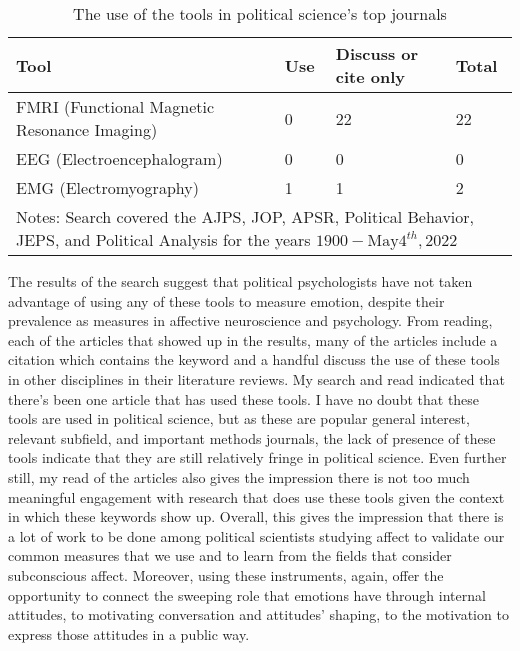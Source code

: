 \documentclass[12pt]{article}
\begin{document}
\begin{table}[h!]
    \centering
    \caption{The use of the tools in political science's top journals}
    \begin{tabular}{p{7cm}p{2cm}p{4cm}p{2cm}}
        \hline
        Tool & Use & Discuss or cite only & Total \\
        \hline
        FMRI (Functional Magnetic Resonance Imaging) & 0 & 22 & 22 \\
        EEG (Electroencephalogram) & 0 & 0 & 0 \\
        EMG (Electromyography) & 1 & 1 & 2 \\
        \hline
        \multicolumn{4}{p{15cm}}{Notes: Search covered the AJPS, JOP, APSR, Political Behavior, JEPS, and Political Analysis for the years $1900 - \text{May} 4^{th}, 2022$}
\end{tabular}
    \label{tab:use_of_tools}
\end{table}

The results of the search suggest that political psychologists have not taken advantage of using any of these tools to measure emotion, despite their prevalence as measures in affective neuroscience and psychology. From reading, each of the articles that showed up in the results, many of the articles include a citation which contains the keyword and a handful discuss the use of these tools in other disciplines in their literature reviews. My search and read indicated that there's been one article that has used these tools. I have no doubt that these tools are used in political science, but as these are popular general interest, relevant subfield, and important methods journals, the lack of presence of these tools indicate that they are still relatively fringe in political science. Even further still, my read of the articles also gives the impression there is not too much meaningful engagement with research that does use these tools given the context in which these keywords show up. Overall, this gives the impression that there is a lot of work to be done among political scientists studying affect to validate our common measures that we use and to learn from the fields that consider subconscious affect. Moreover, using these instruments, again, offer the opportunity to connect the sweeping role that emotions have through internal attitudes, to motivating conversation and attitudes' shaping, to the motivation to express those attitudes in a public way.
\end{document}
